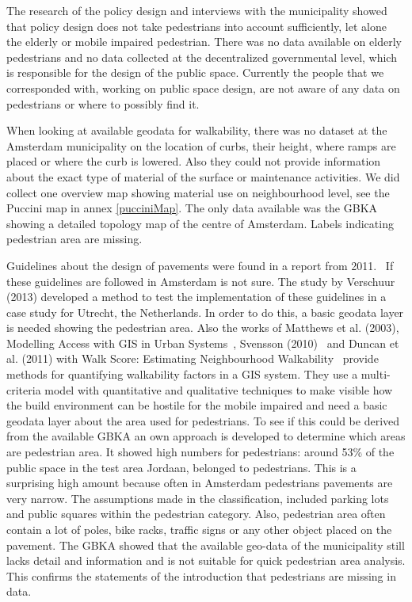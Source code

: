 The research of the policy design and interviews with the municipality showed that policy design does not take pedestrians into account sufficiently, let alone the elderly or mobile impaired pedestrian. There was no data available on elderly pedestrians and no data collected at the decentralized governmental level, which is responsible for the design of the public space. Currently the people that we corresponded with, working on public space design, are not aware of any data on pedestrians or where to possibly find it.

When looking at available geodata for walkability, there was no dataset at the Amsterdam municipality on the location of curbs, their height, where ramps are placed or where the curb is lowered. Also they could not provide information about the exact type of material of the surface or maintenance activities. We did collect one overview map showing material use on neighbourhood level, see the Puccini map in annex \ref{pucciniMap}. The only data available was the GBKA showing a detailed topology map of the centre of Amsterdam. Labels indicating pedestrian area are missing. 

Guidelines about the design of pavements were found in a report from 2011.~\cite{leidraad2011} If these guidelines are followed in Amsterdam is not sure. The study by Verschuur (2013) developed a method to test the implementation of these guidelines in a case study for Utrecht, the Netherlands. In order to do this, a basic geodata layer is needed showing the pedestrian area. Also the works of Matthews et al. (2003), Modelling Access with GIS in Urban Systems~\cite{Matthews2003}, Svensson (2010)~\cite{Svensson2010} and Duncan et al. (2011) with Walk Score: Estimating Neighbourhood Walkability~\cite{Duncan2011} provide methods for quantifying walkability factors in a GIS system. They use a multi-criteria model with quantitative and qualitative techniques to make visible how the build environment can be hostile for the mobile impaired and need a basic geodata layer about the area used for pedestrians. To see if this could be derived from the available GBKA an own approach is developed to determine which areas are pedestrian area. It showed high numbers for pedestrians: around 53\% of the public space in the test area Jordaan, belonged to pedestrians. This is a surprising high amount because often in Amsterdam pedestrians pavements are very narrow. The assumptions made in the classification, included parking lots and public squares within the pedestrian category. Also, pedestrian area often contain a lot of poles, bike racks, traffic signs or any other object placed on the pavement. The GBKA showed that the available geo-data of the municipality still lacks detail and information and is not suitable for quick pedestrian area analysis. This confirms the statements of the introduction that pedestrians are missing in data.

